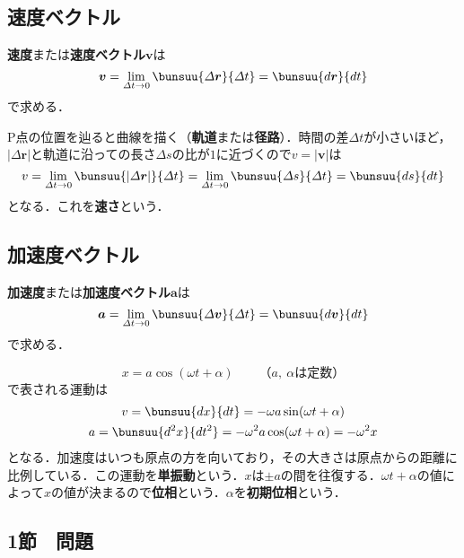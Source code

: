 \subsection{速度ベクトル}

\textbf{速度}または\textbf{速度ベクトル}$\bm{v}$は
\begin{equation}
	\bm{v} = \lim_{\varDelta t \to 0} \bunsuu{\varDelta \bm{r}}{\varDelta t} = \bunsuu{d\bm{r}}{dt}
\end{equation}
で求める．

$\mathrm{P}$点の位置を辿ると曲線を描く（\textbf{軌道}または\textbf{径路}）．時間の差$\varDelta t$が小さいほど，$|\varDelta\bm{r}|$と軌道に沿っての長さ$\varDelta s$の比が$1$に近づくので$v = |\bm{v}|$は
\begin{equation}
	v = \lim_{\varDelta t \to 0} \bunsuu{|\varDelta \bm{r}|}{\varDelta t} = \lim_{\varDelta t \to 0} \bunsuu{\varDelta s}{\varDelta t} = \bunsuu{ds}{dt}
\end{equation}
となる．これを\textbf{速さ}という．



\subsection{加速度ベクトル}

\textbf{加速度}または\textbf{加速度ベクトル}$\bm{a}$は
\begin{equation}
	\bm{a} = \lim_{\varDelta t \to 0} \bunsuu{\varDelta \bm{v}}{\varDelta t} = \bunsuu{d\bm{v}}{dt}
\end{equation}
で求める．

\begin{equation}
	x = a\cos(\omega t + \alpha) \qquad \text{（$a,\ \alpha$は定数）}
\end{equation}
で表される運動は
\begin{gather}
	v = \bunsuu{dx}{dt} = -\omega a \sin(\omega t + \alpha)\\
	a = \bunsuu{d^2x}{dt^2} = -\omega^2 a \cos(\omega t + \alpha) = -\omega^2 x
\end{gather}
となる．加速度はいつも原点の方を向いており，その大きさは原点からの距離に比例している．この運動を\textbf{単振動}という．$x$は$\pm a$の間を往復する．$\omega t + \alpha$の値によって$x$の値が決まるので\textbf{位相}という．$\alpha$を\textbf{初期位相}という．



\subsection{1節　問題}

